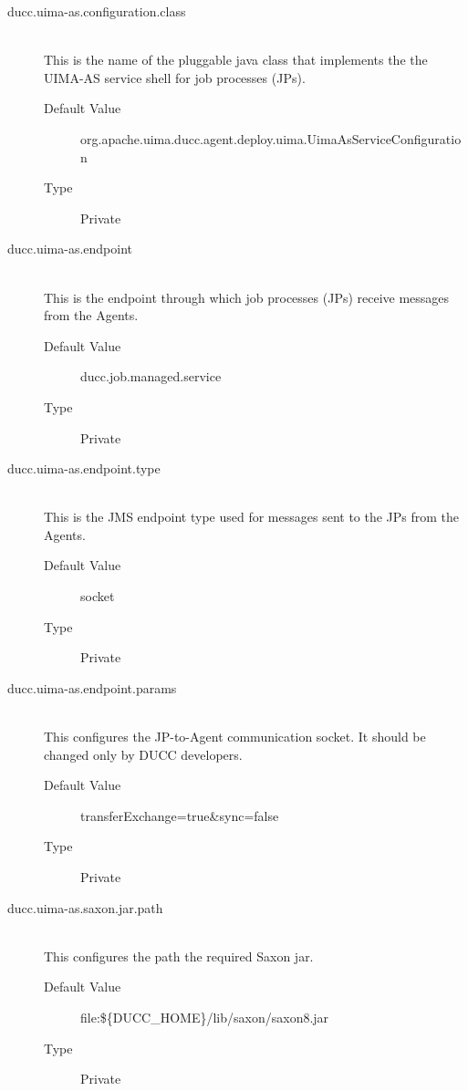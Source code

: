     \begin{description}

      \item[ducc.uima-as.configuration.class] \hfill \\
        This is the name of the pluggable java class that implements the the UIMA-AS service 
        shell for job processes (JPs). 
        \begin{description}
          \item[Default Value] org.apache.uima.ducc.agent.deploy.uima.UimaAsServiceConfiguration 
          \item[Type] Private 
        \end{description}
        
      \item[ducc.uima-as.endpoint] \hfill \\
        This is the endpoint through which job processes (JPs) receive messages from the Agents. 
        \begin{description}
          \item[Default Value] ducc.job.managed.service 
          \item[Type] Private 
        \end{description}
        
      \item[ducc.uima-as.endpoint.type] \hfill \\
        This is the JMS endpoint type used for messages sent to the JPs from the Agents. 
        \begin{description}
          \item[Default Value] socket 
          \item[Type] Private 
        \end{description}
        
      \item[ducc.uima-as.endpoint.params] \hfill \\
        This configures the JP-to-Agent communication socket. It should be changed only by 
        DUCC developers. 
        \begin{description}
          \item[Default Value] transferExchange=true\&sync=false 
          \item[Type] Private
        \end{description} 
        
      \item[ducc.uima-as.saxon.jar.path] \hfill \\
        This configures the path the required Saxon jar. 
        \begin{description}
          \item[Default Value] file:\$\{DUCC\_HOME\}/lib/saxon/saxon8.jar
          \item[Type] Private 
        \end{description}
        


\end{description}
